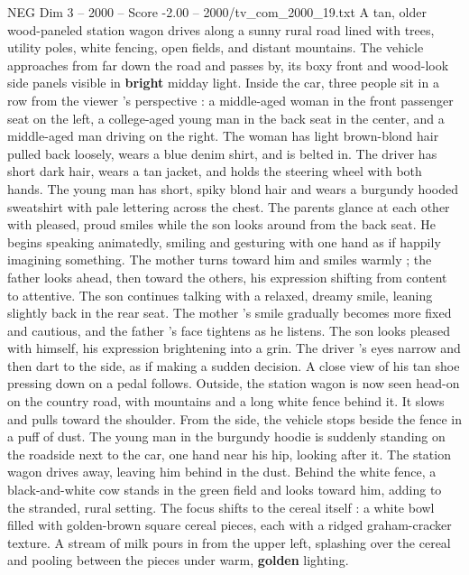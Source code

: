 \begin{textsample}{NEG Dim 3 – 2000 – Score -2.00 – 2000/tv\_com\_2000\_19.txt}  \label{ex:f3_neg_039}
A tan, older wood-paneled station wagon drives along a sunny rural road lined with trees, utility poles, white fencing, open fields, and distant mountains.
The vehicle approaches from far down the road and passes by, its boxy front and wood-look side panels visible in \textbf{bright} midday light.
Inside the car, three people sit in a row from the viewer ’s perspective : a middle-aged woman in the front passenger seat on the left, a college-aged young man in the back seat in the center, and a middle-aged man driving on the right.
The woman has light brown-blond hair pulled back loosely, wears a blue denim shirt, and is belted in.
The driver has short dark hair, wears a tan jacket, and holds the steering wheel with both hands.
The young man has short, spiky blond hair and wears a burgundy hooded sweatshirt with pale lettering across the chest.
The parents glance at each other with pleased, proud smiles while the son looks around from the back seat.
He begins speaking animatedly, smiling and gesturing with one hand as if happily imagining something.
The mother turns toward him and smiles warmly ; the father looks ahead, then toward the others, his expression shifting from content to attentive.
The son continues talking with a relaxed, dreamy smile, leaning slightly back in the rear seat.
The mother ’s smile gradually becomes more fixed and cautious, and the father ’s face tightens as he listens.
The son looks pleased with himself, his expression brightening into a grin.
The driver ’s eyes narrow and then dart to the side, as if making a sudden decision.
A close view of his tan shoe pressing down on a pedal follows.
Outside, the station wagon is now seen head-on on the country road, with mountains and a long white fence behind it.
It slows and pulls toward the shoulder.
From the side, the vehicle stops beside the fence in a puff of dust.
The young man in the burgundy hoodie is suddenly standing on the roadside next to the car, one hand near his hip, looking after it.
The station wagon drives away, leaving him behind in the dust.
Behind the white fence, a black-and-white cow stands in the green field and looks toward him, adding to the stranded, rural setting.
The focus shifts to the cereal itself : a white bowl filled with golden-brown square cereal pieces, each with a ridged graham-cracker texture.
A stream of milk pours in from the upper left, splashing over the cereal and pooling between the pieces under warm, \textbf{golden} lighting.

\end{textsample}
